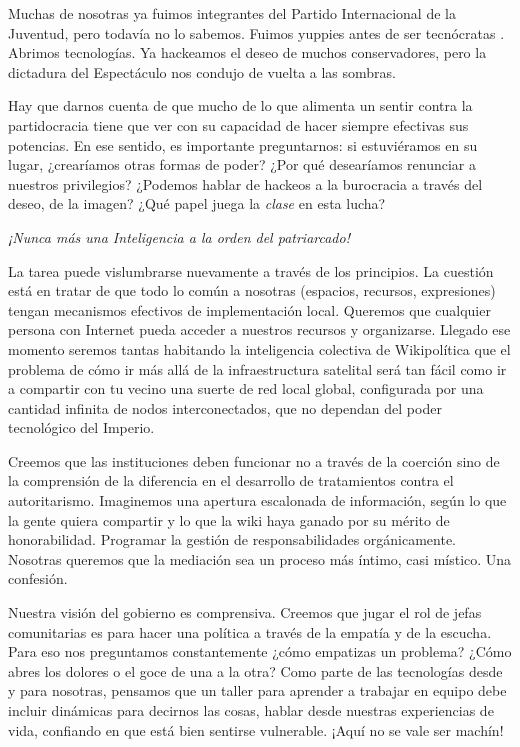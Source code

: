 Muchas de nosotras ya fuimos integrantes del Partido Internacional de la
Juventud, pero todavía no lo sabemos. Fuimos yuppies antes de ser
tecnócratas \cite{BBC2002}. Abrimos tecnologías. Ya
hackeamos el deseo de muchos conservadores, pero la dictadura del
Espectáculo nos condujo de vuelta a las sombras.

Hay que darnos cuenta de que mucho de lo que alimenta un sentir contra
la partidocracia tiene que ver con su capacidad de hacer siempre
efectivas sus potencias. En ese sentido, es importante preguntarnos: si
estuviéramos en su lugar, ¿crearíamos otras formas de poder? ¿Por qué
desearíamos renunciar a nuestros privilegios? ¿Podemos hablar de hackeos
a la burocracia a través del deseo, de la imagen? ¿Qué papel juega la
\emph{clase} en esta lucha?

\emph{¡Nunca más una Inteligencia a la orden del patriarcado!}

La tarea puede vislumbrarse nuevamente a través de los principios. La
cuestión está en tratar de que todo lo común a nosotras (espacios,
recursos, expresiones) tengan mecanismos efectivos de implementación
local. Queremos que cualquier persona con Internet pueda acceder a
nuestros recursos y organizarse. Llegado ese momento seremos tantas
habitando la inteligencia colectiva de Wikipolítica que el problema de
cómo ir más allá de la infraestructura satelital será tan fácil como ir
a compartir con tu vecino una suerte de red local global, configurada
por una cantidad infinita de nodos interconectados, que no dependan del
poder tecnológico del Imperio.

Creemos que las instituciones deben funcionar no a través de la coerción
sino de la comprensión de la diferencia en el desarrollo de tratamientos
contra el autoritarismo. Imaginemos una apertura escalonada de
información, según lo que la gente quiera compartir y lo que la wiki
haya ganado por su mérito de honorabilidad. Programar la gestión de
responsabilidades orgánicamente. Nosotras queremos que la mediación sea
un proceso más íntimo, casi místico. Una confesión.

Nuestra visión del gobierno es comprensiva. Creemos que jugar el rol de
jefas comunitarias es para hacer una política a través de la empatía y
de la escucha. Para eso nos preguntamos constantemente ¿cómo empatizas
un problema? ¿Cómo abres los dolores o el goce de una a la otra? Como
parte de las tecnologías desde y para nosotras, pensamos que un taller
para aprender a trabajar en equipo debe incluir dinámicas para decirnos
las cosas, hablar desde nuestras experiencias de vida, confiando en que
está bien sentirse vulnerable. ¡Aquí no se vale ser
machín! \cite{SailorFag2018}

